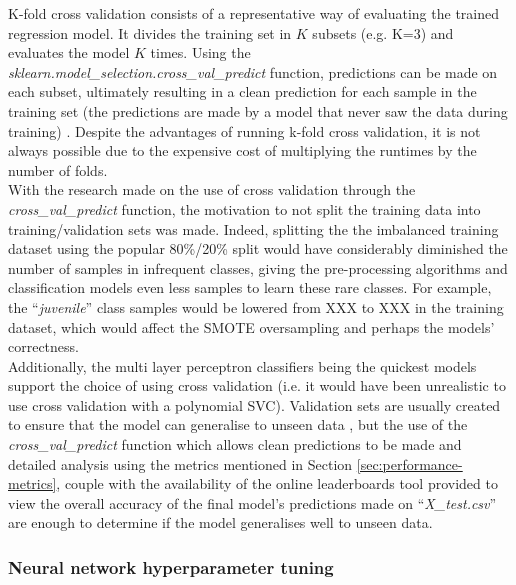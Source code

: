 \documentclass[letterpaper,12pt]{article}
\begin{document}
K-fold cross validation consists of a representative way of evaluating the trained regression model. It divides the training set in $K$ subsets (e.g. K=3) and evaluates the model $K$ times. Using the \textit{sklearn.model\_selection.cross\_val\_predict} function, predictions can be made on each subset, ultimately resulting in a clean prediction for each sample in the training set (the predictions are made by a model that never saw the data during training) \cite{Geron2019}. Despite the advantages of running k-fold cross validation, it is not always possible due to the expensive cost of multiplying the runtimes by the number of folds.\\

With the research made on the use of cross validation through the \textit{cross\_val\_predict} function, the motivation to not split the training data into training/validation sets was made. Indeed, splitting  the the imbalanced training dataset using the popular 80\%/20\% split would have considerably diminished the number of samples  in infrequent classes, giving the pre-processing algorithms and classification models even less samples to learn these rare classes. For example, the ``\textit{juvenile}'' class samples would be lowered from XXX to XXX in the training dataset, which would affect the SMOTE oversampling and perhaps the models' correctness.\\

Additionally, the multi layer perceptron classifiers being the quickest  models  support the choice of using cross validation (i.e. it would have been unrealistic to use cross  validation with a polynomial SVC). Validation sets are usually created to ensure that the model can generalise to unseen data  \cite{Geron2019}, but the use of the \textit{cross\_val\_predict} function which allows clean predictions to be made and detailed analysis using the metrics mentioned in Section \ref{sec:performance-metrics}, couple with the availability of the online leaderboards tool provided to view the overall accuracy of the final model's predictions made on ``\textit{X\_test.csv}'' are enough to determine if the model generalises well to unseen data.

\subsubsection{Neural network hyperparameter tuning}
\end{document}
